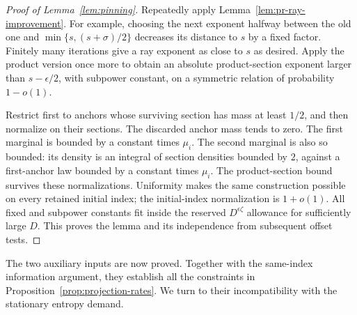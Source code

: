 \begin{proof}[Proof of Lemma~\ref{lem:pinning}]
Repeatedly apply Lemma~\ref{lem:pr-ray-improvement}.
For example, choosing the next exponent halfway between the old
one and $\min\{s,(s+\sigma)/2\}$ decreases its distance to $s$
by a fixed factor. Finitely many iterations give a ray exponent
as close to $s$ as desired. Apply the product version once more to
obtain an absolute product-section exponent larger than
$s-\epsilon/2$, with subpower constant, on a symmetric relation of
probability $1-o(1)$.

Restrict first to anchors whose surviving section has mass at least
$1/2$, and then normalize on their sections. The discarded anchor
mass tends to zero. The first marginal is bounded by a constant
times $\mu_i$. The second marginal is also so bounded: its density
is an integral of section densities bounded by $2$, against a
first-anchor law bounded by a constant times $\mu_i$.
The product-section bound survives these normalizations.
Uniformity makes the same construction possible on every retained
initial index; the initial-index normalization is $1+o(1)$.
All fixed and subpower constants fit inside the reserved
$D^{\epsilon\zeta}$ allowance for sufficiently large $D$.
This proves the lemma and its independence from subsequent offset
tests.
\end{proof}


The two auxiliary inputs are now proved. Together with the same-index
information argument, they establish all the constraints in
Proposition~\ref{prop:projection-rates}. We turn to their incompatibility
with the stationary entropy demand.
